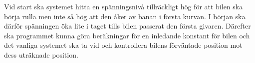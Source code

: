 Vid start ska systemet hitta en spänningsnivå tillräckligt hög för att bilen ska börja rulla men inte
så hög att den åker av banan i första kurvan. I början ska därför spänningen öka lite i taget tills bilen
passerat den första givaren. Därefter ska programmet kunna göra beräkningar för en inledande konstant för bilen och det vanliga systemet ska ta vid och
kontrollera bilens förväntade position mot dess uträknade position.

